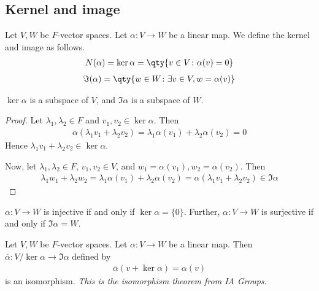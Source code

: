 \subsection{Kernel and image}
\begin{definition}
    Let $V, W$ be $F$-vector spaces.
    Let $\alpha \colon V \to W$ be a linear map.
    We define the kernel and image as follows.
    \begin{align*}
        N(\alpha) = \ker\alpha = \qty{v \in V \colon \alpha(v) = 0}
    \end{align*}
    \begin{align*}
        \Im(\alpha) = \qty{w \in W \colon \exists v \in V, w = \alpha(v)}
    \end{align*}
\end{definition}
\begin{lemma}
    $\ker \alpha$ is a subspace of $V$, and $\Im \alpha$ is a subspace of $W$.
\end{lemma}
\begin{proof}
    Let $\lambda_1, \lambda_2 \in F$ and $v_1, v_2 \in \ker \alpha$.
    Then
    \begin{align*}
        \alpha(\lambda_1 v_1 + \lambda_2 v_2) = \lambda_1 \alpha(v_1) + \lambda_2 \alpha(v_2) = 0
    \end{align*}
    Hence $\lambda_1 v_1 + \lambda_2 v_2 \in \ker \alpha$.

    Now, let $\lambda_1, \lambda_2 \in F$, $v_1, v_2 \in V$, and $w_1 = \alpha(v_1), w_2 = \alpha(v_2)$.
    Then
    \begin{align*}
        \lambda_1 w_1 + \lambda_2 w_2 = \lambda_1 \alpha(v_1) + \lambda_2 \alpha(v_2) = \alpha(\lambda_1 v_1 + \lambda_2 v_2) \in \Im \alpha
    \end{align*}
\end{proof}
\begin{remark}
    $\alpha \colon V \to W$ is injective if and only if $\ker \alpha = \{ 0 \}$.
    Further, $\alpha \colon V \to W$ is surjective if and only if $\Im \alpha = W$.
\end{remark}
\begin{theorem}
    Let $V, W$ be $F$-vector spaces.
    Let $\alpha \colon V \to W$ be a linear map.
    Then $\overline \alpha \colon V / \ker \alpha \to \Im \alpha$ defined by
    \begin{align*}
        \overline \alpha (v + \ker \alpha) = \alpha(v)
    \end{align*}
    is an isomorphism.
    \textit{This is the isomorphism theorem from IA Groups.}
\end{theorem}
